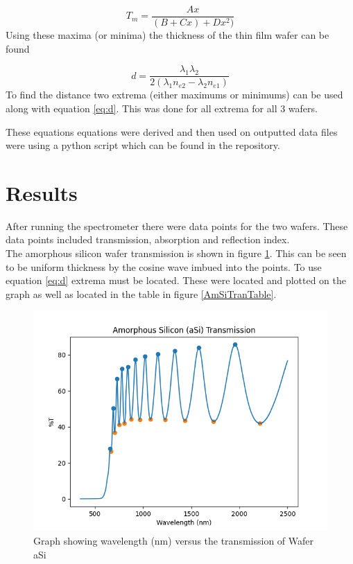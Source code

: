 \documentclass[10pt,a4paper]{article}
\begin{document}
\begin{multicols}{2}
\begin{equation}
\label{eq:Tm}
T_m = \dfrac{Ax}{(B+Cx)+Dx^2)}
\end{equation}
Using these maxima (or minima) the thickness of the thin film wafer can be found 

\begin{equation}
\label{eq:d}
d = \frac{\lambda_1 \lambda_2}{2(\lambda_1 n_{e2} - \lambda_2 n_{e1})}
\end{equation}
To find the distance two extrema (either maximums or minimums) can be used along with equation \ref{eq:d}. This was done for all extrema for all 3 wafers.

These equations equations were derived and then used on outputted data files were using a python script which can be found in the repository.










\section*{Results}
After running the spectrometer there were data points for the two wafers. These data points included transmission, absorption and reflection index.\\
The amorphous silicon wafer transmission is shown in figure \ref{AmSiTran}. This can be seen to be uniform thickness by the cosine wave imbued into the points. To use equation \ref{eq:d} extrema must be located. These were located and plotted on the graph as well as located in the table in figure \ref{AmSiTranTable}.
\begin{figure}[H]
\label{AmSiTran}
\includegraphics[scale=0.5]{AmorphousSilicon}
\caption{Graph showing wavelength (nm) versus the transmission of Wafer aSi}
\end{figure}


\end{multicols}
\end{document}
